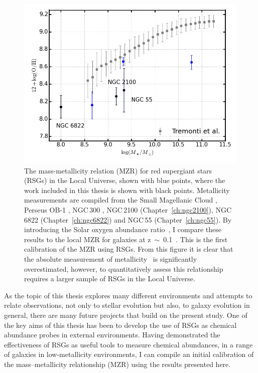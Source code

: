 \begin{figure}
 \centering
\includegraphics[width=\textwidth]{conclusions/MZR-RSGs}
\caption[Mass-metallicity relation from red supergiant stars]{
The mass-metallicity relation (MZR) for red supergiant stars (RSGs) in the Local Universe, shown with blue points, where the work included in this thesis is shown with black points.
Metallicity measurements are compiled from the Small Magellanic Cloud
\protect\citep{2015ApJ...806...21D}, Perseus OB-1
\protect\citep{2014ApJ...788...58G}, NGC\,300
\protect\citep{2015ApJ...805..182G},
NGC\,2100 (Chapter~\ref{ch:ngc2100}),
NGC\,6822 (Chapter~\ref{ch:ngc6822})
and NGC\,55 (Chapter~\ref{ch:ngc55}).
By introducing the Solar oxygen abundance ratio~\citep[12 + $\log$ (O/H)$_{\odot}$~=~8.69;][]{2009ARA&A..47..481A}, I compare these results to the local MZR for galaxies at z~$\sim$~0.1~\citep{Tremonti04}.
This is the first calibration of the MZR using RSGs.
From this figure it is clear that the absolute measurement of metallicity~\citep{Tremonti04} is significantly overestimated, however, to quantitatively assess this relationship requires a larger sample of RSGs in the Local Universe.
\label{fig:concMZR}
         }
\end{figure}

As the topic of this thesis explores many different environments and attempts to relate observations, not only to stellar evolution but also, to galaxy evolution in general, there are many future projects that build on the present study.
One of the key aims of this thesis has been to develop the use of RSGs as chemical abundance probes in external environments.
Having demonstrated the effectiveness of RSGs as useful tools to measure chemical abundances, in a range of galaxies in low-metallicity environments, I can compile an initial calibration of the mass--metallicity relationship (MZR) using the results presented here.

